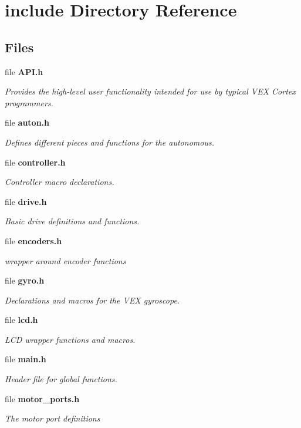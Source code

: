\section{include Directory Reference}
\label{dir_d44c64559bbebec7f509842c48db8b23}
\subsection*{Files}
\begin{DoxyCompactItemize}
\item 
file \textbf{ A\+P\+I.\+h}
\begin{DoxyCompactList}\small\item\em Provides the high-\/level user functionality intended for use by typical V\+EX Cortex programmers. \end{DoxyCompactList}\item 
file \textbf{ auton.\+h}
\begin{DoxyCompactList}\small\item\em Defines different pieces and functions for the autonomous. \end{DoxyCompactList}\item 
file \textbf{ controller.\+h}
\begin{DoxyCompactList}\small\item\em Controller macro declarations. \end{DoxyCompactList}\item 
file \textbf{ drive.\+h}
\begin{DoxyCompactList}\small\item\em Basic drive definitions and functions. \end{DoxyCompactList}\item 
file \textbf{ encoders.\+h}
\begin{DoxyCompactList}\small\item\em wrapper around encoder functions \end{DoxyCompactList}\item 
file \textbf{ gyro.\+h}
\begin{DoxyCompactList}\small\item\em Declarations and macros for the V\+EX gyroscope. \end{DoxyCompactList}\item 
file \textbf{ lcd.\+h}
\begin{DoxyCompactList}\small\item\em L\+CD wrapper functions and macros. \end{DoxyCompactList}\item 
file \textbf{ main.\+h}
\begin{DoxyCompactList}\small\item\em Header file for global functions. \end{DoxyCompactList}\item 
file \textbf{ motor\+\_\+ports.\+h}
\begin{DoxyCompactList}\small\item\em The motor port definitions


\end{DoxyCompactList}
\end{DoxyCompactItemize}
